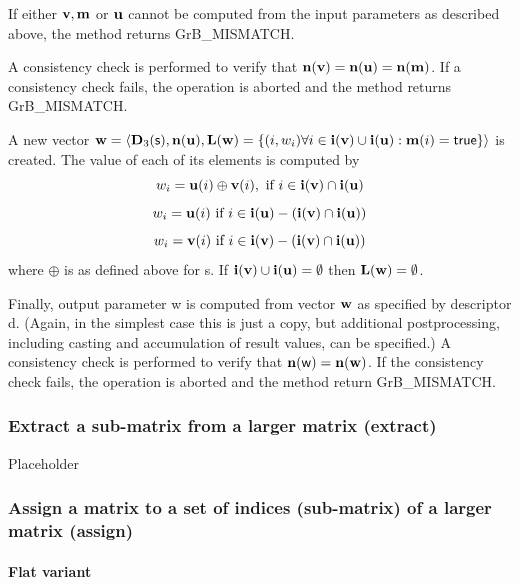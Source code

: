 \documentclass[11pt]{extarticle}
\begin{document}
If either ${\bf v}, {\bf m}$ or ${\bf u}$ cannot be computed
from the input parameters as described above, the method returns {\sf
GrB\_MISMATCH}.

A consistency check is performed to verify that $\bold{n}({\bf v})
= \bold{n}({\bf u}) = \bold{n}({\bf m})$. If a consistency check fails, the operation is
aborted and the method returns {\sf GrB\_MISMATCH}.

A new vector ${\bf w} = \langle \bold{D}_3({\sf s}),
\bold{n}({\bf u}), \bold{L}({\bf w}) = \{(i,w_i)  \forall i \in
{\bf i}({\bf v}) \cup {\bf i}({\bf u}) : {\bf m}(i)
= {\sf true} \} \rangle$ is created.  The value of each of its
elements is computed by 
\[
w_i = {\bf u}(i) \oplus {\bf v}(i), \ \mbox{if}\  i \in  {\bf i}({\bf v}) \cap {\bf i}({\bf u})
\]
\[
w_i = {\bf u}(i) \ \mbox{if}\  i \in  {\bf i}({\bf u}) - ({\bf i}({\bf v}) \cap {\bf i}({\bf u}))
\]
\[
w_i = {\bf v}(i) \ \mbox{if}\  i \in  {\bf i}({\bf v}) - ({\bf i}({\bf v}) \cap {\bf i}({\bf u}))
\]
where $\oplus$ is as defined above for {\sf s}.
If ${\bf i}({\bf v}) \cup {\bf i}({\bf u}) = \emptyset$
then $\bold{L}({\bf w}) = \emptyset$.

Finally, output parameter {\sf w} is computed from vector ${\bf w}$
as specified by descriptor {\sf d}. (Again, in the simplest case this
is just a copy, but additional postprocessing, including casting and
accumulation of result values, can be specified.)  A consistency check is
performed to verify that $\bold{n}({\sf w}) = \bold{n}({\bf w})$. If
the consistency check fails, the operation is aborted and the method
return {\sf GrB\_MISMATCH}.

\subsubsection{Extract a sub-matrix from a larger matrix ({\sf extract})}

Placeholder

\subsubsection{Assign a matrix to a set of indices (sub-matrix) of a larger matrix ({\sf assign})}


\paragraph{Flat variant}
\end{document}
